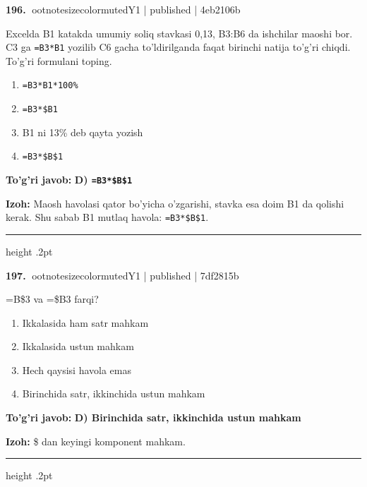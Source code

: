 \documentclass[10pt,a4paper]{article}
\begin{document}
\textbf{\color{ink}196.} {ootnotesizecolor{muted}Y1 | published | 4eb2106b}
\par
Excelda B1 katakda umumiy soliq stavkasi 0,13, B3:B6 da ishchilar maoshi bor. C3 ga \texttt{=B3*B1} yozilib C6 gacha to'ldirilganda faqat birinchi natija to'g'ri chiqdi. To'g'ri formulani toping.
\begin{enumerate}[label=\Alph*),leftmargin=9mm]
\item \texttt{=B3*B1*100\%}
\item \texttt{=B3*\$B1}
\item B1 ni 13\% deb qayta yozish
\item \texttt{=B3*\$B\$1}
\end{enumerate}
\begin{tcolorbox}[enhanced,breakable,colback=teal!4,colframe=teal!55!black,boxrule=0.45pt,arc=1.2mm,left=2.8mm,right=2.8mm,top=2mm,bottom=2mm]
\textbf{\color{teal}To'g'ri javob:} \textbf{D) \texttt{=B3*\$B\$1}}
\par\smallskip
\textbf{Izoh:} Maosh havolasi qator bo'yicha o'zgarishi, stavka esa doim B1 da qolishi kerak. Shu sabab B1 mutlaq havola: \texttt{=B3*\$B\$1}.
\end{tcolorbox}
\vspace{2mm}\hrule height .2pt\vspace{2mm}

\textbf{\color{ink}197.} {ootnotesizecolor{muted}Y1 | published | 7df2815b}
\par
=B\$3 va =\$B3 farqi?
\begin{enumerate}[label=\Alph*),leftmargin=9mm]
\item Ikkalasida ham satr mahkam
\item Ikkalasida ustun mahkam
\item Hech qaysisi havola emas
\item Birinchida satr, ikkinchida ustun mahkam
\end{enumerate}
\begin{tcolorbox}[enhanced,breakable,colback=teal!4,colframe=teal!55!black,boxrule=0.45pt,arc=1.2mm,left=2.8mm,right=2.8mm,top=2mm,bottom=2mm]
\textbf{\color{teal}To'g'ri javob:} \textbf{D) Birinchida satr, ikkinchida ustun mahkam}
\par\smallskip
\textbf{Izoh:} \$ dan keyingi komponent mahkam.
\end{tcolorbox}
\vspace{2mm}\hrule height .2pt\vspace{2mm}
\end{document}
